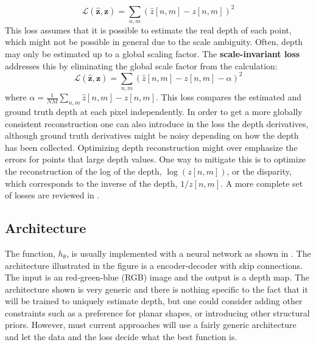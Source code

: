 \begin{equation}
    \mathcal{L} \left( \hat{\mathbf{z}}, \mathbf{z} \right) =  \sum_{n,m} \left( \hat{z}[n,m] - z[n,m] \right) ^2
\end{equation}
This loss assumes that it is possible to estimate the real depth of each point, which might not be possible in general due to the scale ambiguity. Often, depth may only be estimated up to a global scaling factor. The {\bf scale-invariant loss} addresses this by eliminating the global scale factor from the calculation: 
\begin{equation}
    \mathcal{L} \left( \hat{\mathbf{z}}, \mathbf{z} \right) =  \sum_{n,m} \left( \hat{z}[n,m] - z[n,m] - \alpha\right) ^2
\end{equation}
where $\alpha = \frac{1}{NM} \sum_{n,m} \hat{z}[n,m] - z[n,m]$. This loss compares the estimated and ground truth depth at each pixel independently. In order to get a more globally consistent reconstruction one can also introduce in the loss the depth derivatives, although ground truth derivatives might be noisy depending on how the depth has been collected. Optimizing depth reconstruction might over emphasize the errors for points that large depth values. One way to mitigate this is to optimize the reconstruction of the log of the depth, $\log \left( z[n,m] \right)$, or the disparity, which corresponds to the inverse of the depth, $1/z[n,m]$.
A more complete set of losses are reviewed in \cite{Ranftl2021,Ranftl2022}.



\subsection{Architecture}



The function, $h_\theta$, is usually implemented with a neural network as shown in \fig{\ref{fig:encoder_decoder_arch_depth}}. The architecture illustrated in the figure is a encoder-decoder with skip connections. The input is an red-green-blue (RGB) image and the output is a depth map. The architecture shown is very generic and there is nothing specific to the fact that it will be trained to uniquely estimate depth, but one could consider adding other constraints such as a preference for planar shapes, or introducing other structural priors. However, must current approaches will use a fairly generic architecture and let the data and the loss decide what the best function is.  

